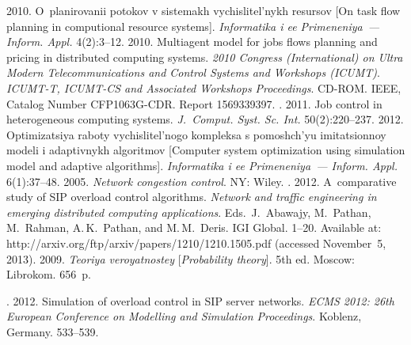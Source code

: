   \begin{multicols}{2}

\renewcommand{\bibname}{\protect\rmfamily References}

{\small\frenchspacing
{%
\begin{thebibliography}{9}

 2010. O~planirovanii potokov v sistemakh vychislitel'nykh resursov 
[On task flow planning in computional resource systems]. \textit{Informatika i ee Primeneniya~---
Inform. Appl.}  4(2):3--12.
 2010. Multiagent model for jobs flows planning and pricing in distributed 
computing systems. \textit{2010 Congress (International) on Ultra Modern 
Telecommunications and Control Systems and Workshops (ICUMT)}. 
\textit{\mbox{ICUMT-T}, ICUMT-CS and Associated Workshops Proceedings}.  
CD-ROM. IEEE, Catalog Number CFP1063G-CDR.  Report 
1569339397.
. 2011.
Job control in heterogeneous computing systems. \textit{J.~Comput. Syst. Sc. Int.} 
50(2):220--237.
 2012. Optimizatsiya raboty vychislitel'nogo kompleksa s pomoshch'yu 
imitatsionnoy modeli i adaptivnykh algoritmov [Computer system optimization using 
simulation model and adaptive algorithms]. \textit{Informatika i ee Primeneniya~---
Inform. Appl.} 6(1):37--48.
 2005. \textit{Network congestion control}. NY: Wiley.
. 2012. A~comparative study of SIP overload control 
algorithms. \textit{Network and traffic engineering in emerging distributed computing 
applications}. Eds.\ J.~Abawajy, M.~Pathan, M.~Rahman, A.\,K.~Pathan, and M.\,M.~Deris. 
IGI Global. 1--20.
Available at: {\sf http://arxiv.org/ftp/arxiv/papers/1210/1210.1505.pdf}
(accessed November~5, 2013).
 2009. \textit{ Teoriya veroyatnostey} [\textit{Probability theory}]. 
5th ed. Moscow: Librokom. 656~p.


 
. 2012. Simulation of overload control in SIP server networks. 
\textit{ECMS 2012: 26th European Conference on Modelling and Simulation 
Proceedings}. Koblenz, Germany. 533--539. 
\end{thebibliography}
} }



\end{multicols}

